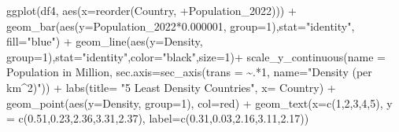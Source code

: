 \documentclass[
]{article}
\newenvironment{Shaded}{\begin{snugshade}}{\end{snugshade}}
\newcommand{\AttributeTok}[1]{\textcolor[rgb]{0.77,0.63,0.00}{#1}}
\newcommand{\DecValTok}[1]{\textcolor[rgb]{0.00,0.00,0.81}{#1}}
\newcommand{\FloatTok}[1]{\textcolor[rgb]{0.00,0.00,0.81}{#1}}
\newcommand{\FunctionTok}[1]{\textcolor[rgb]{0.00,0.00,0.00}{#1}}
\newcommand{\NormalTok}[1]{#1}
\newcommand{\SpecialCharTok}[1]{\textcolor[rgb]{0.00,0.00,0.00}{#1}}
\newcommand{\StringTok}[1]{\textcolor[rgb]{0.31,0.60,0.02}{#1}}
\begin{document}
\begin{Shaded}
\begin{Highlighting}[]
\FunctionTok{ggplot}\NormalTok{(df4, }\FunctionTok{aes}\NormalTok{(}\AttributeTok{x=}\FunctionTok{reorder}\NormalTok{(Country, }\SpecialCharTok{+}\NormalTok{Population\_2022)))  }\SpecialCharTok{+} 
  \FunctionTok{geom\_bar}\NormalTok{(}\FunctionTok{aes}\NormalTok{(}\AttributeTok{y=}\NormalTok{Population\_2022}\SpecialCharTok{*}\FloatTok{0.000001}\NormalTok{, }\AttributeTok{group=}\DecValTok{1}\NormalTok{),}\AttributeTok{stat=}\StringTok{"identity"}\NormalTok{, }\AttributeTok{fill=}\StringTok{"blue"}\NormalTok{) }\SpecialCharTok{+}
  \FunctionTok{geom\_line}\NormalTok{(}\FunctionTok{aes}\NormalTok{(}\AttributeTok{y=}\NormalTok{Density, }\AttributeTok{group=}\DecValTok{1}\NormalTok{),}\AttributeTok{stat=}\StringTok{"identity"}\NormalTok{,}\AttributeTok{color=}\StringTok{"black"}\NormalTok{,}\AttributeTok{size=}\DecValTok{1}\NormalTok{)}\SpecialCharTok{+}
  \FunctionTok{scale\_y\_continuous}\NormalTok{(}\AttributeTok{name =} \StringTok{\textquotesingle{}Population in Million\textquotesingle{}}\NormalTok{, }\AttributeTok{sec.axis=}\FunctionTok{sec\_axis}\NormalTok{(}\AttributeTok{trans =} \SpecialCharTok{\textasciitilde{}}\NormalTok{.}\SpecialCharTok{*}\DecValTok{1}\NormalTok{, }\AttributeTok{name=}\StringTok{"Density (per km\^{}2)"}\NormalTok{)) }\SpecialCharTok{+}
  \FunctionTok{labs}\NormalTok{(}\AttributeTok{title=} \StringTok{"5 Least Density Countries"}\NormalTok{, }\AttributeTok{x=} \StringTok{\textquotesingle{}Country\textquotesingle{}}\NormalTok{) }\SpecialCharTok{+}
  \FunctionTok{geom\_point}\NormalTok{(}\FunctionTok{aes}\NormalTok{(}\AttributeTok{y=}\NormalTok{Density, }\AttributeTok{group=}\DecValTok{1}\NormalTok{), }\AttributeTok{col=}\StringTok{\textquotesingle{}red\textquotesingle{}}\NormalTok{) }\SpecialCharTok{+}
  \FunctionTok{geom\_text}\NormalTok{(}\AttributeTok{x=}\FunctionTok{c}\NormalTok{(}\DecValTok{1}\NormalTok{,}\DecValTok{2}\NormalTok{,}\DecValTok{3}\NormalTok{,}\DecValTok{4}\NormalTok{,}\DecValTok{5}\NormalTok{), }\AttributeTok{y =} \FunctionTok{c}\NormalTok{(}\FloatTok{0.51}\NormalTok{,}\FloatTok{0.23}\NormalTok{,}\FloatTok{2.36}\NormalTok{,}\FloatTok{3.31}\NormalTok{,}\FloatTok{2.37}\NormalTok{), }\AttributeTok{label=}\FunctionTok{c}\NormalTok{(}\FloatTok{0.31}\NormalTok{,}\FloatTok{0.03}\NormalTok{,}\FloatTok{2.16}\NormalTok{,}\FloatTok{3.11}\NormalTok{,}\FloatTok{2.17}\NormalTok{))}
\end{Highlighting}
\end{Shaded}
\end{document}
